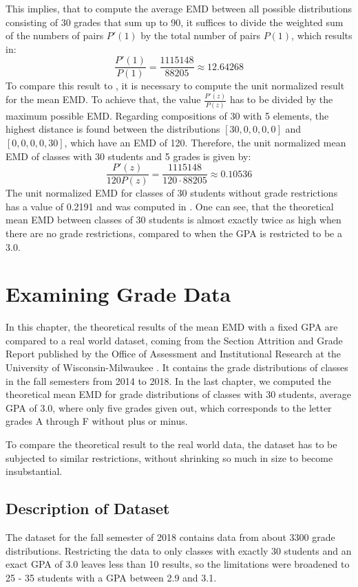 \documentclass[12pt,letterpaper,oneside,openany]{book}
\begin{document}
This implies, that to compute the average EMD between all possible distributions consisting of 30 grades that sum up to 90, it suffices to divide the weighted sum of the numbers of pairs $P'(1)$ by the total number of pairs $P(1)$, which results in:
$$\frac{P'(1)}{P(1)}=\frac{1115148}{88205} \approx 12.64268$$
To compare this result to \cite{bourn2019expected}, it is necessary to compute the unit normalized result for the mean EMD. To achieve that, the value $\frac{P'(z)}{P(z)}$ has to be divided by the maximum possible EMD. Regarding compositions of 30 with 5 elements, the highest distance is found between the distributions  $[30, 0, 0, 0, 0]$ and $[0, 0, 0, 0, 30]$, which have an EMD of 120.
Therefore, the unit normalized mean EMD of classes with 30 students and 5 grades is given by:
$$\frac{P'(z)}{120P(z)} = \frac{1115148}{120\cdot 88205} \approx 0.10536$$
The unit normalized EMD for classes of 30 students without grade restrictions has a value of 0.2191 and was computed in \cite{bourn2019expected}. 
One can see, that the theoretical mean EMD between classes of 30 students is almost exactly twice as high when there are no grade restrictions, compared to when the GPA is restricted to be a 3.0.



\setcounter{chapter}{3}
\chapter{Examining Grade Data}
In this chapter, the theoretical results of the mean EMD with a fixed GPA are compared to  a real world dataset, coming from the Section Attrition and Grade Report published by the Office of Assessment and Institutional Research at the University of Wisconsin-Milwaukee \cite{gradeData}. It contains the grade distributions of classes in the fall semesters from 2014 to 2018.
In the last chapter, we computed the theoretical mean EMD for grade distributions of classes with 30 students, average GPA of 3.0, where only five  grades given out, which corresponds to the letter grades A through F without plus or minus.

To compare the theoretical result to the real world data, the dataset has to be subjected to similar restrictions, without shrinking so much in size to become insubstantial.


\setcounter{section}{0}
\section{Description of Dataset}
The dataset for the fall semester of 2018 contains data from about 3300 grade distributions. Restricting the data to only classes with exactly 30 students and an exact GPA of 3.0 leaves less than 10 results, so the limitations were broadened to 25 - 35 students with a GPA between 2.9 and 3.1. 
\end{document}
